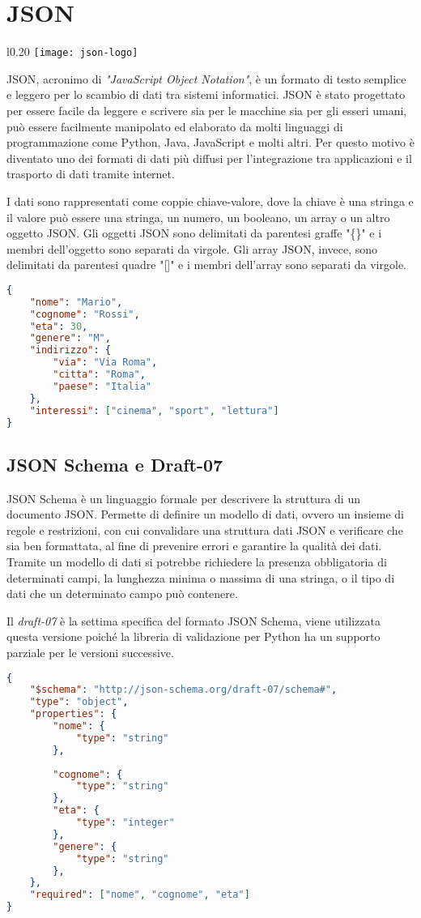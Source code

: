 {\section{JSON}
	
	\begin{wrapfigure}{l}{0.20\textwidth}
		\centering
		\texttt{[image: json-logo]}
	\end{wrapfigure}
	JSON\cite{json}, acronimo di \textit{"JavaScript Object Notation"}, è un formato di testo semplice e leggero per lo scambio di dati tra sistemi informatici. JSON è stato progettato per essere facile da leggere e scrivere sia per le macchine sia per gli esseri umani, può essere facilmente manipolato ed elaborato da molti linguaggi di programmazione come Python, Java, JavaScript e molti altri. Per questo motivo è diventato uno dei formati di dati più diffusi per l'integrazione tra applicazioni e il trasporto di dati tramite internet. \par
	I dati sono rappresentati come coppie chiave-valore, dove la chiave è una stringa e il valore può essere una stringa, un numero, un booleano, un array o un altro oggetto JSON. Gli oggetti JSON sono delimitati da parentesi graffe "\{\}" e i membri dell'oggetto sono separati da virgole. Gli array JSON, invece, sono delimitati da parentesi quadre "[]" e i membri dell'array sono separati da virgole.
	
	{\begin{lstlisting}[language=json, caption={Esempio di oggetto JSON}]
{
	"nome": "Mario",
	"cognome": "Rossi",
	"eta": 30,
	"genere": "M",
	"indirizzo": {
		"via": "Via Roma",
		"citta": "Roma",
		"paese": "Italia"
	},
	"interessi": ["cinema", "sport", "lettura"]
}\end{lstlisting}}
	
	\subsection{JSON Schema e Draft-07}
	JSON Schema\cite{JSON-Schema} è un linguaggio formale per descrivere la struttura di un documento JSON. Permette di definire un modello di dati, ovvero un insieme di regole e restrizioni, con cui convalidare una struttura dati JSON e verificare che sia ben formattata, al fine di prevenire errori e garantire la qualità dei dati. Tramite un modello di dati si potrebbe richiedere la presenza obbligatoria di determinati campi, la lunghezza minima o massima di una stringa, o il tipo di dati che un determinato campo può contenere.\par
	Il \textit{draft-07}\cite{JSON-Schema-Draft-07} è la settima specifica del formato JSON Schema, viene utilizzata questa versione poiché la libreria di validazione per Python\cite{python-jsonschema} ha un supporto parziale per le versioni successive.
{\begin{lstlisting}[language=json, caption={Esempio di modello di dati JSON-Schema}]
{
	"$schema": "http://json-schema.org/draft-07/schema#",
	"type": "object",
	"properties": {
		"nome": {
			"type": "string"
		},
		
		"cognome": {
			"type": "string"
		},
		"eta": {
			"type": "integer"
		},
		"genere": {
			"type": "string"
		},	
	},
	"required": ["nome", "cognome", "eta"]
}\end{lstlisting}}
}